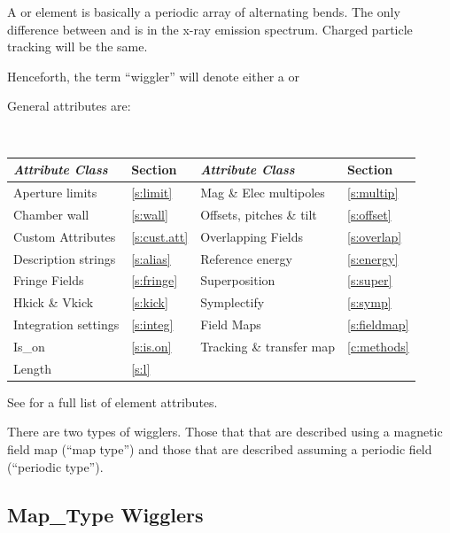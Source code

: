 {A  or  element is basically a periodic array of alternating bends.
The only difference between  and  is in the x-ray emission spectrum.
Charged particle tracking will be the same. 

Henceforth, the term ``wiggler'' will denote either a  or 

General  attributes are:
\begin{center}
\tt
\begin{tabular}{llll} \toprule
  {\sl Attribute Class}      & Section           & {\sl Attribute Class}      & Section            \\ \midrule
  Aperture limits            & \ref{s:limit}     & Mag \& Elec multipoles     & \ref{s:multip}     \\
  Chamber wall               & \ref{s:wall}      & Offsets, pitches \& tilt   & \ref{s:offset}     \\
  Custom Attributes          & \ref{s:cust.att}  & Overlapping Fields         & \ref{s:overlap}    \\
  Description strings        & \ref{s:alias}     & Reference energy           & \ref{s:energy}     \\ 
  Fringe Fields              & \ref{s:fringe}    & Superposition              & \ref{s:super}      \\
  Hkick \& Vkick             & \ref{s:kick}      & Symplectify                & \ref{s:symp}       \\
  Integration settings       & \ref{s:integ}     & Field Maps                 & \ref{s:fieldmap}   \\
  Is_on                      & \ref{s:is.on}     & Tracking \& transfer map   & \ref{c:methods}    \\ 
  Length                     & \ref{s:l}         &                            &                    \\ 
  \bottomrule
\end{tabular}
\end{center}
\toffset
See  for a full list of element attributes.

There are two types of wigglers. Those that that are described using a
magnetic field map (``map type'') and those that are described
assuming a periodic field (``periodic type''). 

\subsection{Map\_Type Wigglers}
\label{s:wiggler.map}

}
